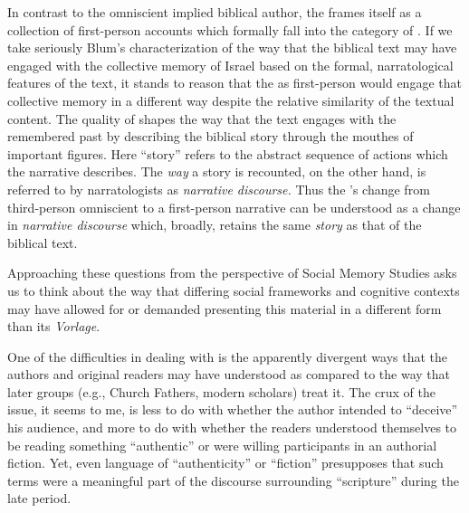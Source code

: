  In contrast to the omniscient implied biblical author, the \ga frames itself as a collection of first-person accounts which formally fall into the category of \psy. If we take seriously Blum's characterization of the way that the biblical text may have engaged with the collective memory of Israel based on the formal, narratological features of the text, it stands to reason that the \ga as first-person \psy would engage that collective memory in a different way despite the relative similarity of the textual content. The \psgraphic quality of \ga shapes the way that the text engages with the remembered past by describing the biblical story through the mouthes of important figures. Here ``story'' refers to the abstract sequence of actions which the narrative describes. The \emph{way} a story is recounted, on the other hand, is referred to by narratologists as \emph{narrative discourse.} Thus the \ga's change from third-person omniscient to a \psgraphical first-person narrative can be understood as a change in \emph{narrative discourse} which, broadly, retains the same \emph{story} as that of the biblical text.

 Approaching these questions from the perspective of Social Memory Studies asks us to think about the way that differing social frameworks and cognitive contexts may have allowed for or demanded presenting this material in a different form than its \emph{Vorlage}.

 One of the difficulties in dealing with \psy is the apparently divergent ways that the authors and original readers may have understood \psy as compared to the way that later groups (e.g., Church Fathers, modern scholars) treat it. The crux of the issue, it seems to me, is less to do with whether the author intended to ``deceive'' his audience, and more to do with whether the readers understood themselves to be reading something ``authentic'' or were willing participants in an authorial fiction. Yet, even language of ``authenticity'' or ``fiction'' presupposes that such terms were a meaningful part of the discourse surrounding ``scripture'' during the late \secondtemple period.

